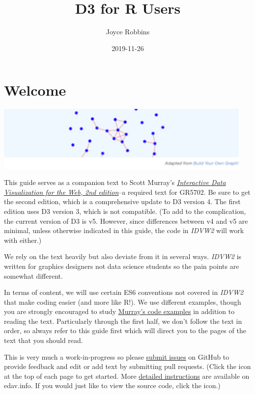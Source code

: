 \documentclass[openany]{book}
\title{D3 for R Users}
\author{Joyce Robbins}
\date{2019-11-26}
\begin{document}
\maketitle

{
\setcounter{tocdepth}{1}
\tableofcontents
}
\hypertarget{welcome}{%
\chapter*{Welcome}\label{welcome}}

\hypertarget{container}{}

\includegraphics[width=5in]{images/networkgraph}

This guide serves as a companion text to Scott Murray's \href{https://www.amazon.com/Interactive-Data-Visualization-Web-Introduction/dp/1491921285/}{\emph{Interactive Data Visualization for the Web, 2nd edition}}--a required text for GR5702. Be sure to get the second edition, which is a comprehensive update to D3 version 4. The first edition uses D3 version 3, which is not compatible. (To add to the complication, the current version of D3 is v5. However, since differences between v4 and v5 are minimal, unless otherwise indicated in this guide, the code in \emph{IDVW2} will work with either.)

We rely on the text heavily but also deviate from it in several ways. \emph{IDVW2} is written for graphics designers not data science students so the pain points are somewhat different.

In terms of content, we will use certain ES6 conventions not covered in \emph{IDVW2} that make coding easier (and more like R!). We use different examples, though you are strongly encouraged to study \href{https://github.com/alignedleft/d3-book/releases}{Murray's code examples} in addition to reading the text. Particularly through the first half, we don't follow the text in order, so always refer to this guide first which will direct you to the pages of the text that you should read.

This is very much a work-in-progress so please \href{https://github.com/jtr13/d3book/issues}{submit issues} on GitHub to provide feedback and edit or add text by submitting pull requests. (Click the icon at the top of each page to get started. More \href{https://edav.info/contribute.html\#step-2-click-the-edit-button}{detailed instructions} are available on edav.info. If you would just like to view the source code, click the icon.)
\end{document}
